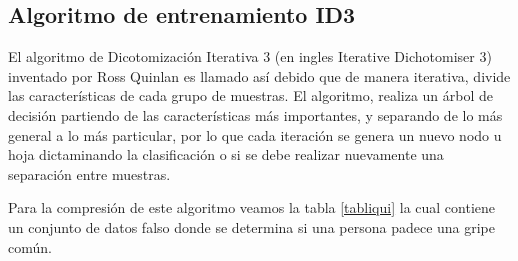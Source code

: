 \documentclass[twoside,spanish,ESP,MSc]{plantillaLabUPV}
\theoremstyle{definition}
\begin{document}
\subsection{Algoritmo de entrenamiento ID3 \cite{c45salz}}

El algoritmo de Dicotomización Iterativa 3 (en ingles Iterative Dichotomiser 3) inventado por Ross Quinlan es llamado así debido que de manera iterativa, divide las características de cada grupo de muestras. El algoritmo, realiza un árbol de decisión partiendo de las características más importantes, y separando de lo más general a lo más particular, por lo que cada iteración se genera un nuevo nodo u hoja dictaminando la clasificación o si se debe realizar nuevamente una separación entre muestras.

Para la compresión de este algoritmo veamos la tabla \ref{tabliqui} la cual contiene un conjunto de datos falso donde se determina si una persona padece una gripe común. 
\end{document}

